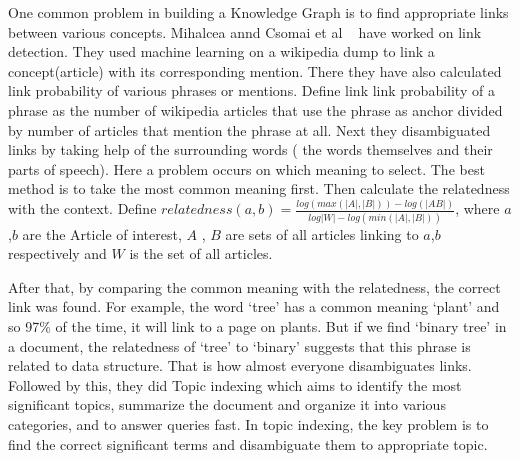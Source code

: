 One common problem in building a Knowledge Graph is to find appropriate links between various 
concepts. Mihalcea annd Csomai et al ~\cite{ref3LinkWikipedia} have worked on link detection. They used 
machine learning on a wikipedia dump to link a concept(article) with its corresponding mention. 
There they have also calculated 
link probability of various phrases or mentions. Define link link probability of a phrase as the 
number of wikipedia articles that use the phrase as anchor divided by  number of articles that mention the phrase at all.
Next they disambiguated links by taking help of the surrounding words 
( the words themselves and their parts of speech). Here a problem occurs on which meaning to select.
The best method is to take the most common meaning first. Then calculate the relatedness
with the context. Define $ relatedness(a,b) = \frac{log(max(|A|, |B|)) - log(|AB|)}{log|W|-log(min(|A|, |B|))} $,
where $a$,$b$ are the Article of interest, $A$ , $B$ are sets of all articles linking to $a$,$b$ respectively and $W$ 
is the set of all articles.

After that, by comparing 
the  common meaning with the relatedness, the correct link was found. 
For example, the word `tree' has a common meaning `plant' and so 97\% of the time, it will link to a page on plants.
But if we find `binary tree' in a document, the relatedness of `tree' to `binary' suggests that this
phrase is related to data structure. That is how almost everyone disambiguates links. Followed by this, they 
did Topic indexing which aims to identify the most significant topics, summarize the document and organize it 
into various categories, and to answer queries fast. In topic indexing, the key problem is to find the correct significant 
terms and disambiguate them to appropriate topic.   



